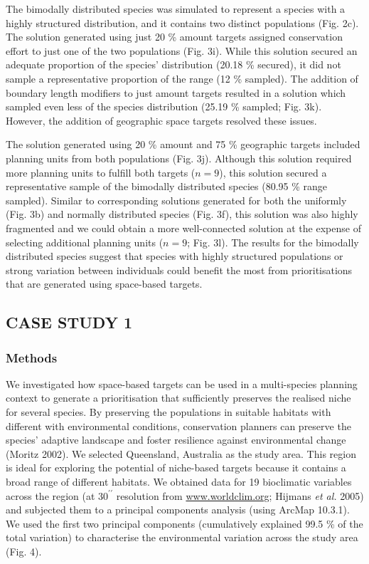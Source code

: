 \documentclass[11pt,]{article}
\begin{document}
The bimodally distributed species was simulated to represent a species
with a highly structured distribution, and it contains two distinct
populations (Fig. 2c). The solution generated using just 20 \% amount
targets assigned conservation effort to just one of the two populations
(Fig. 3i). While this solution secured an adequate proportion of the
species' distribution (20.18 \% secured), it did not sample a
representative proportion of the range (12 \% sampled). The addition of
boundary length modifiers to just amount targets resulted in a solution
which sampled even less of the species distribution (25.19 \% sampled;
Fig. 3k). However, the addition of geographic space targets resolved
these issues.

The solution generated using 20 \% amount and 75 \% geographic targets
included planning units from both populations (Fig. 3j). Although this
solution required more planning units to fulfill both targets ($n=9$),
this solution secured a representative sample of the bimodally
distributed species (80.95 \% range sampled). Similar to corresponding
solutions generated for both the uniformly (Fig. 3b) and normally
distributed species (Fig. 3f), this solution was also highly fragmented
and we could obtain a more well-connected solution at the expense of
selecting additional planning units ($n=9$; Fig. 3l). The results for
the bimodally distributed species suggest that species with highly
structured populations or strong variation between individuals could
benefit the most from prioritisations that are generated using
space-based targets.

\subsection{CASE STUDY 1}\label{case-study-1}

\subsubsection{Methods}\label{methods-2}

We investigated how space-based targets can be used in a multi-species
planning context to generate a prioritisation that sufficiently
preserves the realised niche for several species. By preserving the
populations in suitable habitats with different with environmental
conditions, conservation planners can preserve the species' adaptive
landscape and foster resilience against environmental change (Moritz
2002). We selected Queensland, Australia as the study area. This region
is ideal for exploring the potential of niche-based targets because it
contains a broad range of different habitats. We obtained data for 19
bioclimatic variables across the region (at $30^{\prime \prime}$
resolution from \url{www.worldclim.org}; Hijmans \emph{et al.} 2005) and
subjected them to a principal components analysis (using ArcMap 10.3.1).
We used the first two principal components (cumulatively explained 99.5
\% of the total variation) to characterise the environmental variation
across the study area (Fig. 4).
\end{document}
